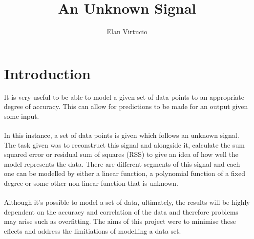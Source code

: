 \documentclass[a4paper,11pt]{article}
\begin{document}
\title{\Large{\textbf{An Unknown Signal}}}
\author{Elan Virtucio}
\date{}
\maketitle

\section{Introduction}
It is very useful to be able to model a given set of data points to an
appropriate degree of accuracy. This can allow for predictions to be made
for an output given some input.
\\ \\
In this instance, a set of data points is given which follows an unknown
signal. The task given was to reconstruct this signal and alongside it,
calculate the sum squared error or residual sum of squares (RSS) to give an
idea of how well the model represents the data.  There are different segments
of this signal and each one can be modelled by either a linear function, a
polynomial function of a fixed degree or some other non-linear function that is unknown.
\\ \\
Although it's possible to model a set of data, ultimately, the results will
be highly dependent on the accuracy and correlation of the data and therefore
problems may arise such as overfitting. The aims of this project were to
minimise these effects and address the limitiations of modelling a data set.
\end{document}
